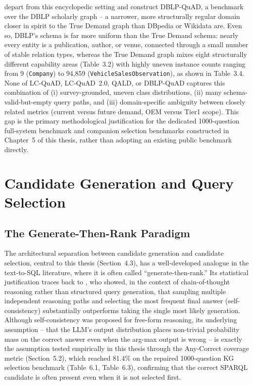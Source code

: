 \documentclass[
  12pt,
  english,
  oneside]{report}
\begin{document}
\citet{banerjee2023dblpquad} depart from this encyclopedic setting and
construct DBLP-QuAD, a benchmark over the DBLP scholarly graph -- a
narrower, more structurally regular domain closer in spirit to the True
Demand graph than DBpedia or Wikidata are. Even so, DBLP's schema is far
more uniform than the True Demand schema: nearly every entity is a
publication, author, or venue, connected through a small number of stable
relation types, whereas the True Demand graph mixes eight structurally
different capability areas (Table~3.2) with highly uneven instance counts
ranging from 9 (\texttt{Company}) to 94{,}859
(\texttt{VehicleSalesObservation}), as shown in Table~3.4. None of
LC-QuAD, LC-QuAD~2.0, QALD, or DBLP-QuAD captures this combination of
(i) survey-grounded, uneven class distributions, (ii) many
schema-valid-but-empty query paths, and (iii) domain-specific ambiguity
between closely related metrics (current versus future demand, OEM versus
Tier1 scope). This gap is the primary methodological justification for the
dedicated 1000-question full-system benchmark and companion selection
benchmarks constructed in Chapter~5 of this thesis, rather than adopting an
existing public benchmark directly.

\section{Candidate Generation and Query Selection}
\label{sec:query-selection-detailed}

\subsection{The Generate-Then-Rank Paradigm}

The architectural separation between candidate generation and candidate
selection, central to this thesis (Section~4.3), has a well-developed
analogue in the text-to-SQL literature, where it is often called
``generate-then-rank.'' Its statistical justification traces back to
\citet{wang2023selfconsistency}, who showed, in the context of
chain-of-thought reasoning rather than structured query generation, that
sampling multiple independent reasoning paths and selecting the most
frequent final answer (self-consistency) substantially outperforms taking
the single most likely generation. Although self-consistency was proposed
for free-form reasoning, its underlying assumption -- that the LLM's
output distribution places non-trivial probability mass on the correct
answer even when the arg-max output is wrong -- is exactly the assumption
tested empirically in this thesis through the Any-Correct coverage metric
(Section~5.2), which reached 81.4\% on the repaired 1000-question KG
selection benchmark (Table~6.1, Table~6.3), confirming that the correct
SPARQL candidate is often present even when it is not selected first.
\end{document}

